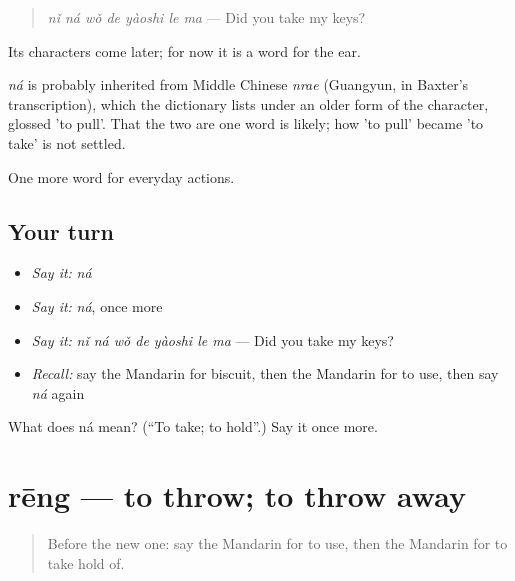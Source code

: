 \begin{quote}
\emph{nǐ ná wǒ de yàoshi le ma} — Did you take my keys?
\end{quote}

Its characters come later; for now it is a word for the ear.

\begin{cousinweb}
\emph{ná} is probably inherited from Middle Chinese \emph{nrae} (Guangyun, in Baxter's transcription), which the dictionary lists under an older form of the character, glossed 'to pull'. That the two are one word is likely; how 'to pull' became 'to take' is not settled.
\end{cousinweb}

\begin{grammarlens}[title={What you've built}]
One more word for everyday actions.
\end{grammarlens}

\subsection*{Your turn}
\begin{itemize}
\raggedright
  \item \emph{Say it:} \emph{ná}
  \item \emph{Say it:} \emph{ná}, once more
  \item \emph{Say it:} \emph{nǐ ná wǒ de yàoshi le ma} — Did you take my keys?
  \item \emph{Recall:} say the Mandarin for biscuit, then the Mandarin for to use, then say \emph{ná} again
\end{itemize}

\begin{tcolorbox}[breakable,colback=teal!4,colframe=teal!35!black,title={Before you move on}]
What does ná mean? (\textquotedblleft{}To take; to hold\textquotedblright{}.) Say it once more.
\end{tcolorbox}
\section[rēng]{rēng — to throw; to throw away}

\label{lesson:ZH-C103-reng}



\begin{quote}
Before the new one: say the Mandarin for to use, then the Mandarin for to take hold of.
\end{quote}

